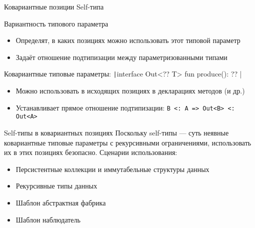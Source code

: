 \documentclass[handout,aspectratio=169,usenames,dvipsnames]{beamer}
\begin{document}
    \begin{frame}{Ковариантные позиции Self-типа}
        \begin{block}{Вариантность типового параметра}
            \begin{itemize}
                \item Определят, в каких позициях можно использовать этот типовой параметр
                \item Задаёт отношение подтипизации между параметризованными типами
            \end{itemize}
        \end{block}
        \pause
        \begin{block}{Ковариантные типовые параметры: \texttt|interface Out<?? T> { fun produce(): ?? }|}
            \begin{itemize}
                \item Можно использовать в исходящих позициях в декларациях методов (и др.)
                \item Устанавливает прямое отношение подтипизации: \texttt{B <: A => Out<B> <: Out<A>}
            \end{itemize}
        \end{block}
        \pause
        \begin{block}{Self-типы в ковариантных позициях}
            Поскольку self-типы --- суть неявные ковариантные типовые параметры с рекурсивными ограничениями, использовать их в этих позициях безопасно.
            Сценарии использования:
            \begin{itemize}
                \item Персистентные коллекции и иммутабельные структуры данных
                \item Рекурсивные типы данных
                \item Шаблон абстрактная фабрика
                \item Шаблон наблюдатель
            \end{itemize}
        \end{block}
    \end{frame}
\end{document}

